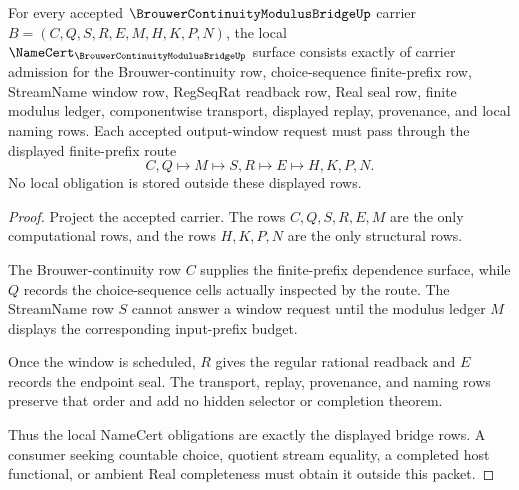 \begin{theorem}
\label{thm:brouwer-continuity-modulus-bridge-namecert-obligations}
For every accepted $\BrouwerContinuityModulusBridgeUp$ carrier $B=(C,Q,S,R,E,M,H,K,P,N)$, the local $\NameCert_{\BrouwerContinuityModulusBridgeUp}$ surface consists exactly of carrier admission for the Brouwer-continuity row, choice-sequence finite-prefix row, StreamName window row, RegSeqRat readback row, Real seal row, finite modulus ledger, componentwise transport, displayed replay, provenance, and local naming rows. Each accepted output-window request must pass through the displayed finite-prefix route
$$
C,Q \longmapsto M \longmapsto S,R \longmapsto E \longmapsto H,K,P,N .
$$
No local obligation is stored outside these displayed rows.
\end{theorem}
\begin{proof}
Project the accepted carrier. The rows $C,Q,S,R,E,M$ are the only computational rows, and the rows $H,K,P,N$ are the only structural rows.

The Brouwer-continuity row $C$ supplies the finite-prefix dependence surface, while $Q$ records the choice-sequence cells actually inspected by the route. The StreamName row $S$ cannot answer a window request until the modulus ledger $M$ displays the corresponding input-prefix budget.

Once the window is scheduled, $R$ gives the regular rational readback and $E$ records the endpoint seal. The transport, replay, provenance, and naming rows preserve that order and add no hidden selector or completion theorem.

Thus the local NameCert obligations are exactly the displayed bridge rows. A consumer seeking countable choice, quotient stream equality, a completed host functional, or ambient Real completeness must obtain it outside this packet.
\end{proof}

